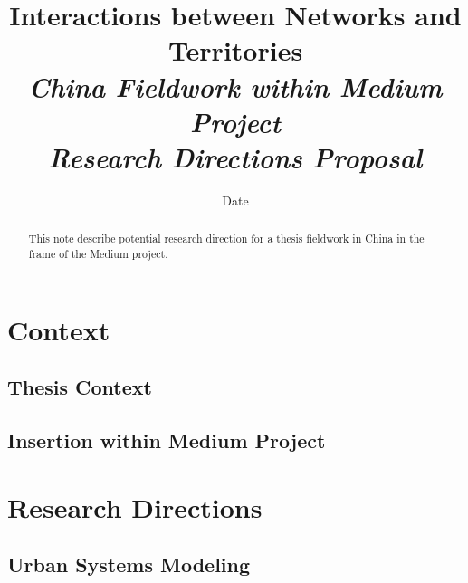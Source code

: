 


\title{Interactions between Networks and Territories\\
\textit{China Fieldwork within Medium Project}\\
\textit{Research Directions Proposal}
}
\author{}
\date{Date}


\maketitle

\justify


\begin{abstract}
This note describe potential research direction for a thesis fieldwork in China in the frame of the Medium project.
\end{abstract}



\section{Context}

\subsection{Thesis Context}




\subsection{Insertion within Medium Project}





\section{Research Directions}

\subsection{Urban Systems Modeling}

%


